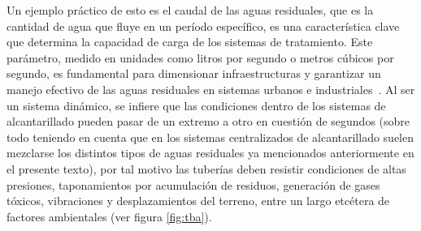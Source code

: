 Un ejemplo práctico de esto es el caudal de las aguas residuales, que es la cantidad de agua que fluye en un período específico, es una característica clave que determina la capacidad de carga de los sistemas de tratamiento. Este parámetro, medido en unidades como litros por segundo o metros cúbicos por segundo, es fundamental para dimensionar infraestructuras y garantizar un manejo efectivo de las aguas residuales en sistemas urbanos e industriales~\citep{crites2000}. Al ser un sistema dinámico, se infiere que las condiciones dentro de los sistemas de alcantarillado pueden pasar de un extremo a otro en cuestión de segundos (sobre todo teniendo en cuenta que en los sistemas centralizados de alcantarillado suelen mezclarse los distintos tipos de aguas residuales ya mencionados anteriormente en el presente texto), por tal motivo las tuberías deben resistir condiciones de altas presiones, taponamientos por acumulación de residuos, generación de gases tóxicos, vibraciones y desplazamientos del terreno, entre un largo etcétera de factores ambientales (ver figura \ref{fig:tba}).
